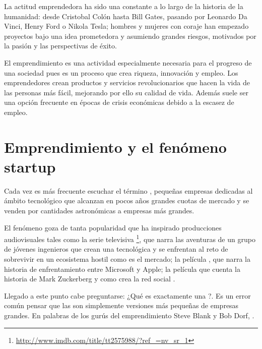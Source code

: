 La actitud emprendedora ha sido una constante a lo largo de la historia de la humanidad: desde Cristobal Colón hasta Bill Gates, pasando por Leonardo Da Vinci, Henry Ford o Nikola Tesla; hombres y mujeres con coraje han empezado proyectos bajo una idea prometedora y asumiendo grandes riesgos, motivados por la pasión y las perspectivas de éxito. 

El emprendimiento es una actividad especialmente necesaria para el progreso de una sociedad pues es un proceso que crea riqueza, innovación y empleo. Los emprendedores crean productos y servicios revolucionarios que hacen la vida de las personas más fácil, mejorando por ello su calidad de vida. Además suele ser una opción frecuente en épocas de crisis económicas debido a la escasez de empleo.

\section{Emprendimiento y el fenómeno startup}

Cada vez es más frecuente escuchar el término , pequeñas empresas dedicadas al ámbito tecnológico que alcanzan en pocos años grandes cuotas de mercado y se venden por cantidades astronómicas a empresas más grandes.

El fenómeno goza de tanta popularidad que ha inspirado producciones audiovisuales tales como la serie televisiva \footnote{\url{http://www.imdb.com/title/tt2575988/?ref_=nv_sr_1}}, que narra las aventuras de un grupo de jóvenes ingenieros que crean una  tecnológica y se enfrentan al reto de sobrevivir en un ecosistema hostil como es el mercado; la película , que narra la historia de enfrentamiento entre Microsoft y Apple; la película  que cuenta la historia de Mark Zuckerberg y como crea la red social .

Llegado a este punto cabe preguntarse: ¿Qué es exactamente una ?. Es un error común pensar que las  son simplemente versiones más pequeñas de empresas grandes. En palabras de los gurús del emprendimiento Steve Blank y Bob Dorf, \cite{steveblankbobdorf2013}.

